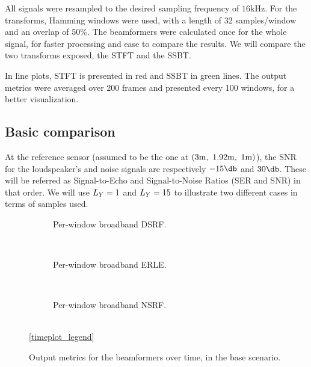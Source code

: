 All signals were resampled to the desired sampling frequency of $16\si{\kilo\hertz}$. For the transforms, Hamming windows were used, with a length of 32 samples/window and an overlap of $50\%$. The beamformers were calculated once for the whole signal, for faster processing and ease to compare the results. We will compare the two transforms exposed, the STFT and the SSBT.

In line plots, STFT is presented in red and SSBT in green lines. The output metrics were averaged over 200 frames and presented every 100 windows, for a better visualization.
%

\subsection{Basic comparison}
At the reference sensor (assumed to be the one at $(3\si{\meter},~1.92\si{\meter},~1\si{\meter})$), the SNR for the loudspeaker's and noise signals are respectively $-15\dB$ and $30\dB$. These will be referred as Signal-to-Echo and Signal-to-Noise Ratios (SER and SNR) in that order. We will use $\Ly = 1$ and $\Ly = 15$ to illustrate two different cases in terms of samples used.


\begin{figure}[!t]
	\centering
	\begin{subfigure}{\textwidth}
		\centering
		
		\caption{Per-window broadband DSRF.}
		\label{subfig:lineplot__DSRF_l__iSER_n15__err_0}
	\end{subfigure}\\[1em]
	\begin{subfigure}{\textwidth}
		\centering
		
		\caption{Per-window broadband ERLE.}
		\label{subfig:lineplot__gSER_l__iSER_n15__err_0}
	\end{subfigure}\\[1em]
	\begin{subfigure}{\textwidth}
		\centering
		
		\caption{Per-window broadband NSRF.}
		\label{subfig:lineplot__gSNR_l__iSER_n15__err_0}
	\end{subfigure}\\[1em]
	\ref*{timeplot_legend}
	\caption{Output metrics for the beamformers over time, in the base scenario.}
	\label{fig:lineplot__iSER_n15__Ly_1__err_0}
\end{figure}

